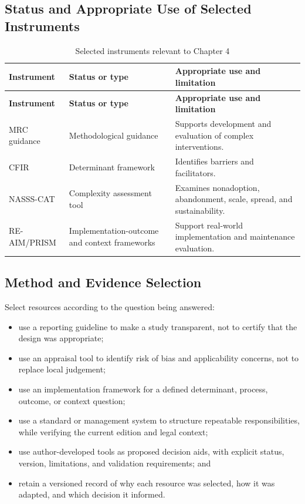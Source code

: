 \subsection{Status and Appropriate Use of Selected Instruments}
\begin{longtable}{@{}p{}p{}p{}@{}}
\caption{Selected instruments relevant to Chapter 4}
\label{tab:comp-ch04-instrument-status}\\
\toprule
\textbf{Instrument} & \textbf{Status or type} & \textbf{Appropriate use and limitation} \\
\midrule
\endfirsthead
\toprule
\textbf{Instrument} & \textbf{Status or type} & \textbf{Appropriate use and limitation} \\
\midrule
\endhead
\bottomrule
\endlastfoot
MRC guidance & Methodological guidance & Supports development and evaluation of complex interventions. \\
CFIR & Determinant framework & Identifies barriers and facilitators. \\
NASSS-CAT & Complexity assessment tool & Examines nonadoption, abandonment, scale, spread, and sustainability. \\
RE-AIM/PRISM & Implementation-outcome and context frameworks & Support real-world implementation and maintenance evaluation. \\
\end{longtable}

\subsection{Method and Evidence Selection}
Select resources according to the question being answered:
\begin{itemize}
 \item use a reporting guideline to make a study transparent, not to certify that the design was appropriate;
 \item use an appraisal tool to identify risk of bias and applicability concerns, not to replace local judgement;
 \item use an implementation framework for a defined determinant, process, outcome, or context question;
 \item use a standard or management system to structure repeatable responsibilities, while verifying the current edition and legal context;
 \item use author-developed tools as proposed decision aids, with explicit status, version, limitations, and validation requirements; and
 \item retain a versioned record of why each resource was selected, how it was adapted, and which decision it informed.
\end{itemize}

